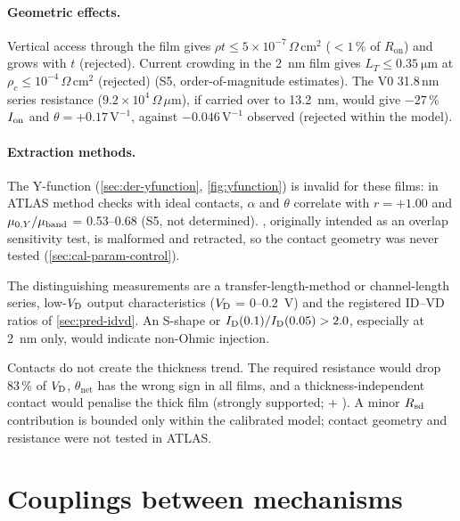 \paragraph{Geometric effects.} Vertical access through the film gives $\rho t \le 5\times10^{-7}\,\Omega\,\mathrm{cm^2}$ ($<1$\,\% of $R_{\mathrm{on}}$) and grows with $t$ (rejected). Current crowding in the \SI{2}{nm} film gives $L_T \le \SI{0.35}{\micro\metre}$ at $\rho_c \le 10^{-4}\,\Omega\,\mathrm{cm^2}$ (rejected) (S5, order-of-magnitude estimates). The V0 31.8\,nm series resistance ($9.2\times10^{4}\,\Omega\,\mu\mathrm{m}$), if carried over to \SI{13.2}{nm}, would give $-27$\,\% $I_{\mathrm{on}}$ and $\theta = +0.17\,\mathrm{V^{-1}}$, against $-0.046\,\mathrm{V^{-1}}$ observed (rejected within the model).

\paragraph{Extraction methods.} The Y-function (\cref{sec:der-yfunction}, \cref{fig:yfunction}) is invalid for these films: in ATLAS method checks with ideal contacts, $\alpha$ and $\theta$ correlate with $r = +1.00$ and $\mu_{0,Y}/\mu_{\mathrm{band}}$ = 0.53--0.68 (S5, not determined). , originally intended as an overlap sensitivity test, is malformed and retracted, so the contact geometry was never tested (\cref{sec:cal-param-control}).

The distinguishing measurements are a transfer-length-method or channel-length series, low-$V_{\mathrm{D}}$ output characteristics ($V_{\mathrm{D}}$ = 0--\SI{0.2}{V}) and the registered ID--VD ratios of \cref{sec:pred-idvd}. An S-shape or $I_{\mathrm{D}}(0.1)/I_{\mathrm{D}}(0.05) > 2.0$, especially at \SI{2}{nm} only, would indicate non-Ohmic injection.

\begin{keyresult}[title={Contacts: verdict}]
Contacts do not create the thickness trend. The required resistance would drop 83\,\% of $V_{\mathrm{D}}$, $\theta_{\mathrm{net}}$ has the wrong sign in all films, and a thickness-independent contact would penalise the thick film (strongly supported; \evCORR{} + \evLIT). A minor $R_{\mathrm{sd}}$ contribution is bounded only within the calibrated model; contact geometry and resistance were not tested in ATLAS.
\end{keyresult}

\section{Couplings between mechanisms}\label{sec:mech-couplings}

